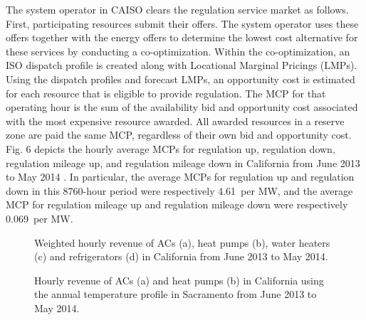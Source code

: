 \documentclass[onecolumn,journal]{IEEEtran}
\begin{document}
The system operator in \ac{CAISO} clears the regulation service market as follows. First, participating resources submit their offers. The system operator uses these offers together with the energy offers to  determine the lowest cost alternative for these services by conducting a co-optimization. Within the co-optimization, an ISO dispatch profile is created along with Locational Marginal Pricings (LMPs). Using the dispatch profiles and forecast LMPs, an opportunity cost  is estimated for each resource that is eligible to provide regulation. The \ac{MCP} for that operating hour is the sum of the availability bid and opportunity cost associated with the most expensive resource awarded. All awarded resources in a reserve zone are paid the same \ac{MCP}, regardless of their own bid and opportunity cost. Fig.  6 depicts the hourly average MCPs for regulation up, regulation down, regulation mileage up, and regulation mileage down in California from June 2013 to May 2014 \cite{OASIS}. In particular, the average MCPs for regulation up and regulation down in this 8760-hour period were respectively 4.61\ per MW, and the average MCP for regulation mileage up and regulation mileage down were respectively 0.069\ per MW. 

\begin{figure}[tb]
\centering
{}
\caption{Weighted hourly revenue of ACs (a), heat pumps (b), water heaters (c) and refrigerators (d) in California from June 2013 to May 2014. }\label{fig:yearly_revenue}
\end{figure}

\begin{figure}[tb]
\centering
{}
\caption{Hourly revenue of ACs (a) and heat pumps (b) in California using the annual temperature profile in Sacramento from June 2013 to May 2014. }\label{fig:yearly_revenue}
\end{figure}
\end{document}
